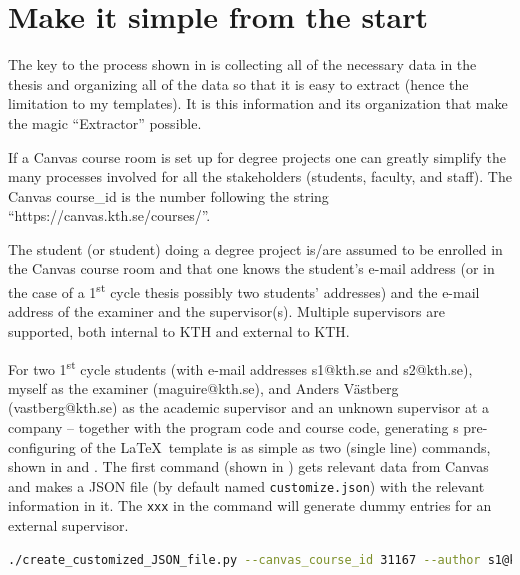 \section{Make it simple from the start}
\label{sec:makeItSimpleFromTheStart}

The key to the process shown in  is collecting all of the necessary data in the thesis and organizing all of the data so that it is easy to extract (hence the limitation to my templates). It is this information and its organization that make the magic ``Extractor'' possible.

If a Canvas course room is set up for degree projects one can greatly simplify the many processes involved for all the stakeholders (students, faculty, and staff). The Canvas course\_id is the number following the string ``https://canvas.kth.se/courses/''.

The student (or student) doing a degree project is/are assumed to be enrolled in the Canvas course room and that one knows the student’s e-mail address (or in the case of a 1\textsuperscript{st} cycle thesis possibly two students’ addresses) and the e-mail address of the examiner and the supervisor(s). Multiple supervisors are supported, both internal to KTH and external to KTH.

For two 1\textsuperscript{st} cycle students (with e-mail addresses s1@kth.se and s2@kth.se), myself as the examiner (maguire@kth.se), and Anders Västberg (vastberg@kth.se) as the academic supervisor and an unknown supervisor at a company – together with the program code and course code, generating s pre-configuring of the \LaTeX~template is as simple as two (single line) commands, shown in  and . The first command (shown in ) gets relevant data from Canvas and makes a JSON file (by default named \texttt{customize.json}) with the relevant information in it. The \texttt{xxx} in the command will generate dummy entries for an external supervisor.

\begin{lstlisting}[language={bash}, caption={Example of creating a customized JSON file for two students}, label=lst:createCustomizeJSON]
./create_customized_JSON_file.py --canvas_course_id 31167 --author s1@kth.se --author2 s2@kth.se --language eng --programCode TIDAB --Examiner maguire --Supervisor vastberg   --Supervisor2 xxx --courseCode II142X  --exam högskoleingenjör
\end{lstlisting}

